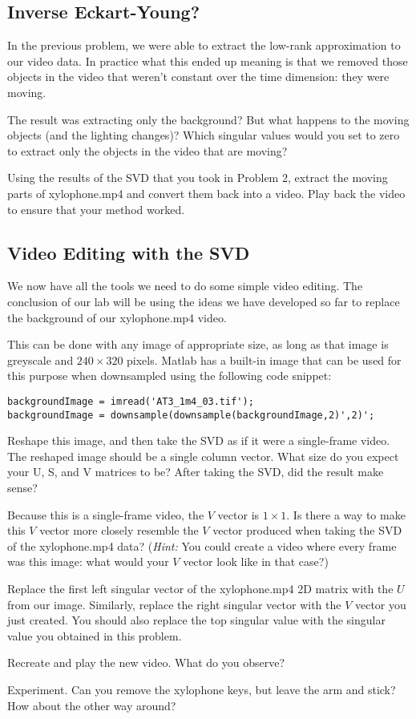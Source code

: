 \subsection{Inverse Eckart-Young?}

In the previous problem, we were able to extract the low-rank approximation to our video data. In practice what this ended up meaning is that we removed those objects in the video that weren't constant over the time dimension: they were moving.

The result was extracting only the background? But what happens to the moving objects (and the lighting changes)? Which singular values would you set to zero to extract only the objects in the video that are moving?

Using the results of the SVD that you took in Problem 2, extract the moving parts of xylophone.mp4 and convert them back into a video. Play back the video to ensure that your method worked.

\subsection{Video Editing with the SVD}

We now have all the tools we need to do some simple video editing. The conclusion of our lab will be using the ideas we have developed so far to replace the background of our xylophone.mp4 video.

This can be done with any image of appropriate size, as long as that image is greyscale and $240\times 320$ pixels. Matlab has a built-in image that can be used for this purpose when downsampled using the following code snippet:

\begin{lstlisting}[style=code]
backgroundImage = imread('AT3_1m4_03.tif');
backgroundImage = downsample(downsample(backgroundImage,2)',2)';
\end{lstlisting}

Reshape this image, and then take the SVD as if it were a single-frame video. The reshaped image should be a single column vector. What size do you expect your U, S, and V matrices to be? After taking the SVD, did the result make sense?

Because this is a single-frame video, the $V$ vector is $1\times 1$. Is there a way to make this $V$ vector more closely resemble the $V$ vector produced when taking the SVD of the xylophone.mp4 data?
(\textit{Hint:}  You could create a video where every frame was this image: what would your $V$ vector look like in that case?)

Replace the first left singular vector of the xylophone.mp4 2D matrix with the $U$ from our image. Similarly, replace the right singular vector with the $V$ vector you just created. You should also replace the top singular value with the singular value you obtained in this problem.

Recreate and play the new video. What do you observe?

Experiment. Can you remove the xylophone keys, but leave the arm and stick? How about the other way around?



